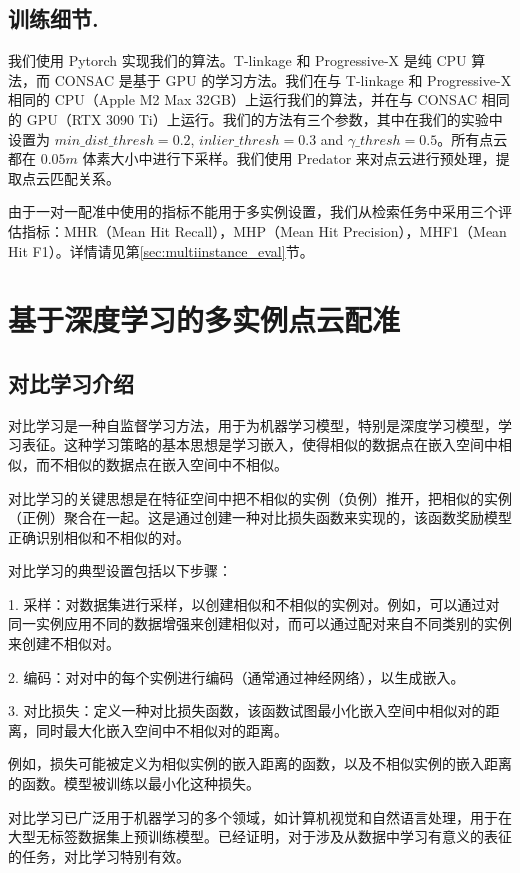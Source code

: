 \subsection{训练细节.}
我们使用 Pytorch\cite{PyTorch} 实现我们的算法。T-linkage 和 Progressive-X 是纯 CPU 算法，而 CONSAC 是基于 GPU 的学习方法。我们在与 T-linkage 和 Progressive-X 相同的 CPU（Apple M2 Max 32GB）上运行我们的算法，并在与 CONSAC 相同的 GPU（RTX 3090 Ti）上运行。我们的方法有三个参数，其中在我们的实验中设置为 $min\_dist\_thresh=0.2$, $inlier\_thresh=0.3$ and $\gamma\_thresh=0.5$。所有点云都在 $0.05m$ 体素大小中进行下采样。我们使用 Predator \cite{huang2021predator} 来对点云进行预处理，提取点云匹配关系。

由于一对一配准中使用的指标不能用于多实例设置，我们从检索任务中采用三个评估指标：MHR（Mean Hit Recall），MHP（Mean Hit Precision），MHF1（Mean Hit F1）。详情请见第\ref{sec:multiinstance_eval}节。

\section{基于深度学习的多实例点云配准}
\subsection{对比学习介绍}
对比学习是一种自监督学习方法，用于为机器学习模型，特别是深度学习模型，学习表征。这种学习策略的基本思想是学习嵌入，使得相似的数据点在嵌入空间中相似，而不相似的数据点在嵌入空间中不相似。

对比学习的关键思想是在特征空间中把不相似的实例（负例）推开，把相似的实例（正例）聚合在一起。这是通过创建一种对比损失函数来实现的，该函数奖励模型正确识别相似和不相似的对。

对比学习的典型设置包括以下步骤：

1. 采样：对数据集进行采样，以创建相似和不相似的实例对。例如，可以通过对同一实例应用不同的数据增强来创建相似对，而可以通过配对来自不同类别的实例来创建不相似对。

2. 编码：对对中的每个实例进行编码（通常通过神经网络），以生成嵌入。

3. 对比损失：定义一种对比损失函数，该函数试图最小化嵌入空间中相似对的距离，同时最大化嵌入空间中不相似对的距离。

例如，损失可能被定义为相似实例的嵌入距离的函数，以及不相似实例的嵌入距离的函数。模型被训练以最小化这种损失。

对比学习已广泛用于机器学习的多个领域，如计算机视觉和自然语言处理，用于在大型无标签数据集上预训练模型。已经证明，对于涉及从数据中学习有意义的表征的任务，对比学习特别有效\cite{tian2020makes}。

